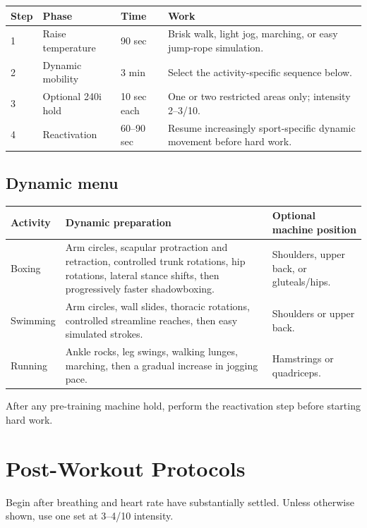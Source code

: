 \documentclass[10pt,letterpaper]{article}
\begin{document}
\begin{tabularx}{\textwidth}{@{}C{0.55in}L{1.35in}L{1.05in}Y@{}}
\toprule
{}
\color{white}\textbf{Step} & \color{white}\textbf{Phase} & \color{white}\textbf{Time} & \color{white}\textbf{Work} \\
 & Raise temperature & 90 sec & Brisk walk, light jog, marching, or easy jump-rope simulation. \\
2 & Dynamic mobility & 3 min & Select the activity-specific sequence below. \\
3 & Optional 240i hold & 10 sec each & One or two restricted areas only; intensity 2--3/10. \\
4 & Reactivation & 60--90 sec & Resume increasingly sport-specific dynamic movement before hard work. \\
\bottomrule
\end{tabularx}

\subsection{Dynamic menu}

\begin{tabularx}{\textwidth}{@{}L{1.1in}Y L{1.75in}@{}}
\toprule
{}
\textbf{Activity} & \textbf{Dynamic preparation} & \textbf{Optional machine position} \\
\midrule
Boxing & Arm circles, scapular protraction and retraction, controlled trunk rotations, hip rotations, lateral stance shifts, then progressively faster shadowboxing. & Shoulders, upper back, or gluteals/hips. \\
Swimming & Arm circles, wall slides, thoracic rotations, controlled streamline reaches, then easy simulated strokes. & Shoulders or upper back. \\
Running & Ankle rocks, leg swings, walking lunges, marching, then a gradual increase in jogging pace. & Hamstrings or quadriceps. \\
\bottomrule
\end{tabularx}

After any pre-training machine hold, perform the reactivation step before starting hard work.

\section{Post-Workout Protocols}

Begin after breathing and heart rate have substantially settled. Unless otherwise shown, use one set at 3--4/10 intensity.
\end{document}
